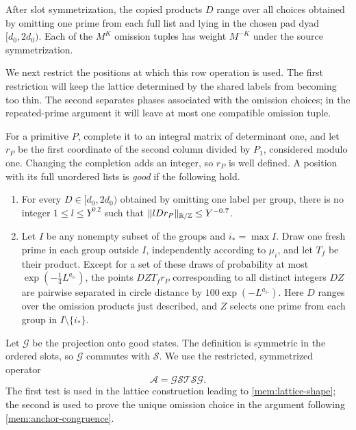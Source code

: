After slot symmetrization, the copied products $D$ range over all choices
obtained by omitting one prime from each full list and lying in the chosen
pad dyad $[d_0,2d_0)$. Each of the $M^K$ omission tuples has weight
$M^{-K}$ under the source symmetrization.

We next restrict the positions at which this row operation is used.
The first restriction will keep the lattice determined by the shared
labels from becoming too thin. The second separates phases associated
with the omission choices; in the repeated-prime argument it will leave
at most one compatible omission tuple.

For a primitive $P$, complete it to an integral matrix of determinant
one, and let $r_P$ be the first coordinate of the second column
divided by $P_1$, considered modulo one.  Changing the completion
adds an integer, so $r_P$ is well defined.  A position with its
full unordered lists is \emph{good} if the following hold.
\begin{enumerate}[label=(\roman*)]
\item\label{det:good-first} For every $D\in[d_0,2d_0)$ obtained by
omitting one label per group, there is no integer
$1\leq l\leq Y^{0.2}$ such that
$\|lDr_P\|_{\mathbb R/\mathbb Z}\leq Y^{-0.7}$.
\item\label{det:good-second} Let $I$ be any nonempty subset of the
groups and $i_* =\max I$.  Draw one fresh prime in each group
outside $I$, independently according to $\mu_i$, and let $T_f$
be their product.  Except for a set of these draws of probability
at most $\exp(-\tfrac14L^{a_{i_*}})$, the points
$DZ T_f r_P$ corresponding to all distinct integers $DZ$ are
pairwise separated in circle distance by
$100\exp(-L^{a_{i_*}})$.  Here $D$ ranges over the omission
products just described, and $Z$ selects one prime from each
group in $I\setminus\{i_*\}$.
\end{enumerate}
Let $\mathcal G$ be the projection onto good states. The definition
is symmetric in the ordered slots, so $\mathcal G$ commutes with
$\mathcal S$. We use the restricted, symmetrized operator
\[
 \mathcal A=\mathcal G\mathcal S\mathcal T\mathcal S\mathcal G.
\]
The first test is used in the lattice construction leading to
\eqref{mem:lattice-shape}; the second is used to prove the unique
omission choice in the argument following \eqref{mem:anchor-congruence}.

